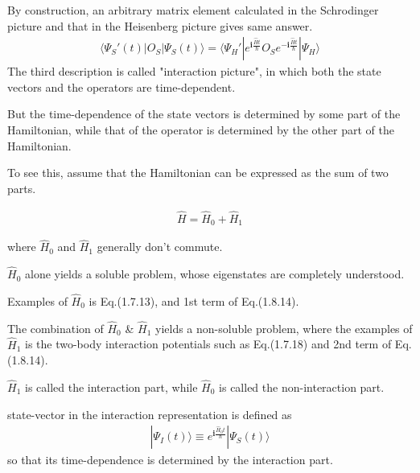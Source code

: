  By construction, an arbitrary matrix element calculated in the Schrodinger picture and that in the Heisenberg picture gives same answer.
\begin{align}
\langle\Psi_S'(t)|O_S|\Psi_S(t)\rangle=\langle\Psi_H'|e^{\bm{i}  \frac{\hat Ht}{\hbar}}O_Se^{-\bm{i}  \frac{\hat Ht}{\hbar}}|\Psi_H\rangle \nonumber
\end{align}
 The third description is called "interaction picture", in which both the state vectors and the operators are time-dependent.

 But the time-dependence of the state vectors is determined by some part of the Hamiltonian, while that of the operator is determined by the other part of the Hamiltonian.

 To see this, assume  that the Hamiltonian can be expressed as the sum of two parts.

\begin{align}
\hat H=\hat H_0+\hat H_1 \nonumber
\end{align}

  where $\hat H_0$ and $\hat H_1$ generally don't commute.

 $\hat H_0$ alone yields a soluble problem, whose eigenstates are completely understood.

 Examples of $\hat H_0$ is Eq.(1.7.13), and 1st term of Eq.(1.8.14).

 The combination of $\hat H_0$ \& $\hat H_1$ yields a non-soluble problem, where the examples of $\hat H_1$ is the two-body interaction potentials such as Eq.(1.7.18) and 2nd term of Eq.(1.8.14).

 $\hat H_1$ is called the interaction part, while $\hat H_0$ is called the non-interaction part.

 state-vector in the interaction representation is defined as
\begin{align}
|\Psi_I(t)\rangle \equiv e^{\bm{i}  \frac{\hat H_0t}{\hbar}}|\Psi_S(t)\rangle
\end{align}
so that its time-dependence is determined by the interaction part.

